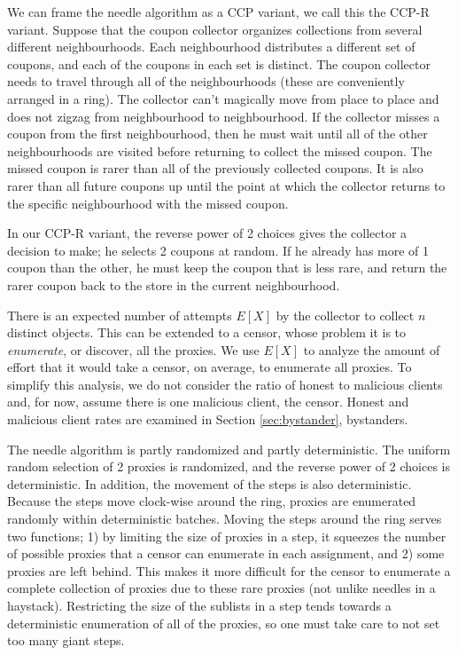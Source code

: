 We can frame the needle algorithm as a \ac{CCP} variant, we call this the \ac{CCP-R} variant. Suppose that the coupon collector organizes collections from several different neighbourhoods. Each neighbourhood distributes a different set of coupons, and each of the coupons in each set is distinct. The coupon collector needs to travel through all of the neighbourhoods (these are conveniently arranged in a ring). The collector can't magically move from place to place and does not zigzag from neighbourhood to neighbourhood. If the collector misses a coupon from the first neighbourhood, then he must wait until all of the other neighbourhoods are visited before returning to collect the missed coupon. The missed coupon is rarer than all of the previously collected coupons. It is also rarer than all future coupons up until the point at which the collector returns to the specific neighbourhood with the missed coupon.

In our \ac{CCP-R} variant, the reverse power of 2 choices gives the collector a decision to make; he selects 2 coupons at random. If he already has more of 1 coupon than the other, he must keep the coupon that is less rare, and return the rarer coupon back to the store in the current neighbourhood. 

There is an expected number of attempts $E[X]$ by the collector to collect $n$ distinct objects. This can be extended to a censor, whose problem it is to \textit{enumerate}, or discover, all the proxies. We use $E[X]$ to analyze the amount of effort that it would take a censor, on average, to enumerate all proxies. To simplify this analysis, we do not consider the ratio of honest to malicious clients and, for now, assume there is one malicious client, the censor. Honest and malicious client rates are examined in Section \ref{sec:bystander}, bystanders.

The needle algorithm is partly randomized and partly deterministic. The uniform random selection of 2 proxies is randomized, and the reverse power of 2 choices is deterministic. In addition, the movement of the steps is also deterministic. Because the steps move clock-wise around the ring, proxies are enumerated randomly within deterministic batches. Moving the steps around the ring serves two functions; 1) by limiting the size of proxies in a step, it squeezes the number of possible proxies that a censor can enumerate in each assignment, and 2) some proxies are left behind. This makes it more difficult for the censor to enumerate a complete collection of proxies due to these rare proxies (not unlike needles in a haystack). Restricting the size of the sublists in a step tends towards a deterministic enumeration of all of the proxies, so one must take care to not set too many giant steps. 

